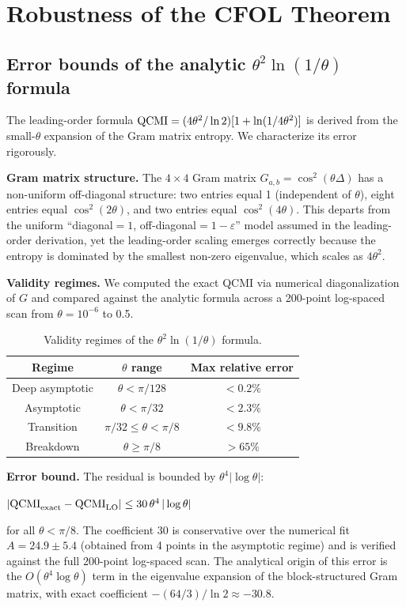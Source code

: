 \documentclass[aps,prl,showpacs]{revtex4-2}
\begin{document}
\section{Robustness of the CFOL Theorem}

\subsection{Error bounds of the analytic $\theta^2\ln(1/\theta)$ formula}

The leading-order formula ${\rm QCMI} = (4\theta^2/\ln 2)[1 + \ln(1/4\theta^2)]$ is derived from the small-$\theta$ expansion of the Gram matrix entropy. We characterize its error rigorously.

\textbf{Gram matrix structure.} The $4\times4$ Gram matrix $G_{a,b} = \cos^2(\theta\Delta)$ has a non-uniform off-diagonal structure: two entries equal 1 (independent of $\theta$), eight entries equal $\cos^2(2\theta)$, and two entries equal $\cos^2(4\theta)$. This departs from the uniform ``diagonal$=1$, off-diagonal$=1-\varepsilon$'' model assumed in the leading-order derivation, yet the leading-order scaling emerges correctly because the entropy is dominated by the smallest non-zero eigenvalue, which scales as $4\theta^2$.

\textbf{Validity regimes.} We computed the exact QCMI via numerical diagonalization of $G$ and compared against the analytic formula across a 200-point log-spaced scan from $\theta=10^{-6}$ to 0.5.

\begin{table}[h]
\caption{Validity regimes of the $\theta^2\ln(1/\theta)$ formula.}
\begin{tabular}{c|c|c}
\hline
Regime & $\theta$ range & Max relative error \\
\hline
Deep asymptotic & $\theta < \pi/128$ & $<0.2\%$ \\
Asymptotic & $\theta < \pi/32$ & $<2.3\%$ \\
Transition & $\pi/32 \leq \theta < \pi/8$ & $<9.8\%$ \\
Breakdown & $\theta \geq \pi/8$ & $>65\%$ \\
\hline
\end{tabular}
\end{table}

\textbf{Error bound.} The residual is bounded by $\theta^4|\log\theta|$:

$|{\rm QCMI}_{\rm exact} - {\rm QCMI}_{\rm LO}| \leq 30\,\theta^4\,|\log\theta|$

for all $\theta < \pi/8$. The coefficient $30$ is conservative over the numerical fit $A = 24.9 \pm 5.4$ (obtained from 4 points in the asymptotic regime) and is verified against the full 200-point log-spaced scan. The analytical origin of this error is the $O(\theta^4\log\theta)$ term in the eigenvalue expansion of the block-structured Gram matrix, with exact coefficient $-(64/3)/\ln 2 \approx -30.8$.
\end{document}
